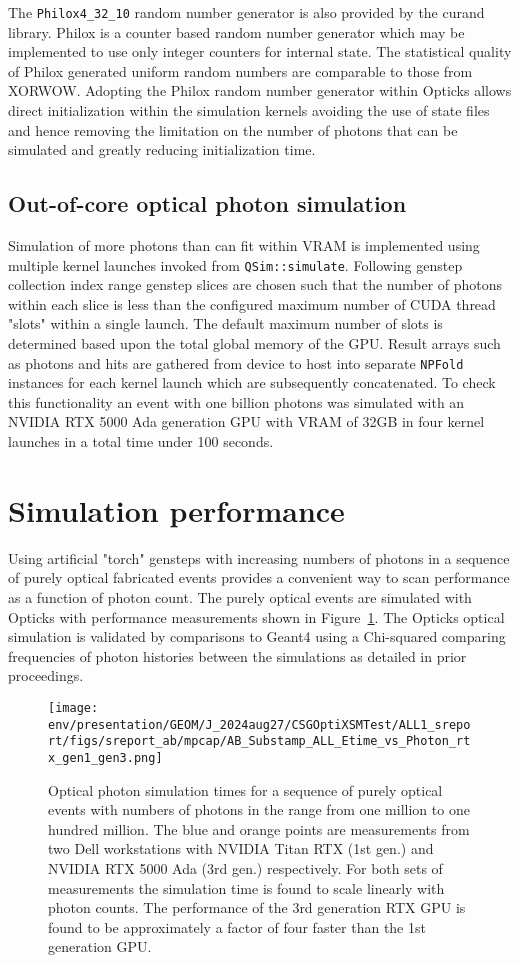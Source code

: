 \documentclass{webofc}
\begin{document}
The {\tt Philox4\_32\_10} random number generator is also provided by the curand library. 
Philox is a counter based random number generator which may be implemented to 
use only integer counters for internal state. 
The statistical quality of Philox generated uniform random numbers are comparable to those from XORWOW\cite{curandRNGTest}.
Adopting the Philox random number generator within Opticks allows direct initialization within
the simulation kernels avoiding the use of state files and hence removing the 
limitation on the number of photons that can be simulated and greatly reducing 
initialization time. 
%
\subsection{Out-of-core optical photon simulation}
%
Simulation of more photons than can fit within VRAM is implemented
using multiple kernel launches invoked from {\tt QSim::simulate}. 
Following genstep collection index range genstep slices are chosen 
such that the number of photons within each slice is less than 
the configured maximum number of CUDA thread "slots" within a single launch.
The default maximum number of slots is determined based upon the total
global memory of the GPU. Result arrays such as photons and hits are gathered
from device to host into separate {\tt NPFold} instances for each kernel launch 
which are subsequently concatenated. To check this functionality 
an event with one billion photons was simulated with an NVIDIA RTX 5000 Ada 
generation GPU with VRAM of 32GB in four kernel launches 
in a total time under 100 seconds. 
%
\section{Simulation performance}
%
Using artificial "torch" gensteps with increasing numbers of photons in a sequence of 
purely optical fabricated events provides a convenient way to scan performance as 
a function of photon count. The purely optical events are simulated with Opticks with
performance measurements shown in Figure~\ref{rtxgenscan}.
The Opticks optical simulation is validated by comparisons to Geant4 using a Chi-squared comparing
frequencies of photon histories between the simulations as detailed in prior proceedings. 
%
\begin{figure}
\centering
\texttt{[image: env/presentation/GEOM/J\_2024aug27/CSGOptiXSMTest/ALL1\_sreport/figs/sreport\_ab/mpcap/AB\_Substamp\_ALL\_Etime\_vs\_Photon\_rtx\_gen1\_gen3.png]}
\caption{%
Optical photon simulation times for a sequence of purely optical events with numbers of photons 
in the range from one million to one hundred million. The blue and orange points are measurements from 
two Dell workstations with NVIDIA Titan RTX (1st gen.) and NVIDIA RTX 5000 Ada (3rd gen.) respectively.
For both sets of measurements the simulation time is found to scale linearly with photon counts. The 
performance of the 3rd generation RTX GPU is found to be approximately a factor of four faster 
than the 1st generation GPU.%
}
\label{rtxgenscan}
\vspace{-5mm}
\end{figure}%
%
%
\end{document}
